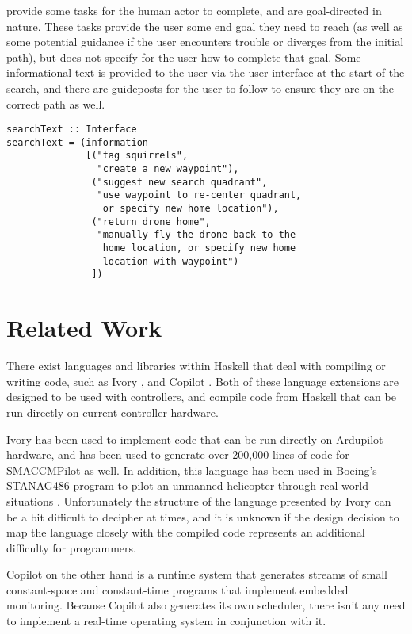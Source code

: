 \documentclass{sig-alternate-05-2015}
\begin{document}
 provide some tasks for the human actor to complete, and
are goal-directed in nature. These tasks provide the user some end goal they
need to reach (as well as some potential guidance if the user encounters
trouble or diverges from the initial path), but does not specify for the user
how to complete that goal. Some informational text is provided to the user via
the user interface at the start of the search, and there are guideposts for
the user to follow to ensure they are on the correct path as well.

\begin{lstlisting}
searchText :: Interface
searchText = (information
              [("tag squirrels",
                "create a new waypoint"),
               ("suggest new search quadrant",
                "use waypoint to re-center quadrant,
                 or specify new home location"),
               ("return drone home",
                "manually fly the drone back to the
                 home location, or specify new home
                 location with waypoint")
               ])
\end{lstlisting}
\fi


\section{Related Work}
\label{sec:related}
There exist languages and libraries within Haskell that deal with compiling or
writing  code, such as Ivory \cite{elliot2015ivory}, and Copilot
\cite{pike2010copilot}. Both of these language extensions are designed to be
used with controllers, and compile  code from Haskell that can be
run directly on current controller hardware.

Ivory has been used to implement code that can be run directly on Ardupilot
hardware, and has been used to generate over 200,000 lines of code for
SMACCMPilot as well. In addition, this language has been used in Boeing's
STANAG486 program to pilot an unmanned helicopter through real-world
situations \cite{boeing2016auto}. Unfortunately the structure of the language
presented by Ivory can be a bit difficult to decipher at times, and it is
unknown if the design decision to map the language closely with the compiled
code represents an additional difficulty for programmers.

Copilot on the other hand is a runtime system that generates streams of small
constant-space and constant-time  programs that implement embedded
monitoring. Because Copilot also generates its own scheduler, there isn't any
need to implement a real-time operating system in conjunction with it.
\end{document}
